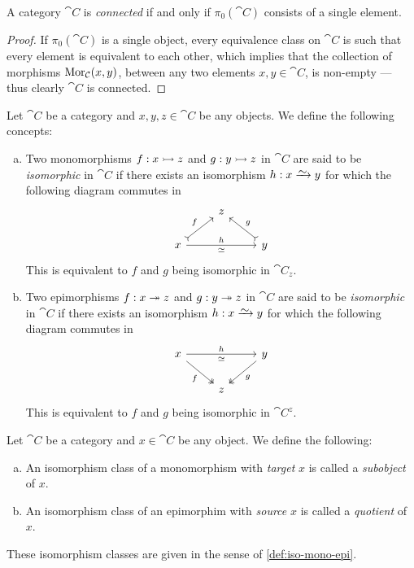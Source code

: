 \begin{corollary}
\label{cor:connected-iff-class-point}
A category \(\cat C\) is \emph{connected} if and only if \(\pi_0(\cat C)\)
consists of a single element.
\end{corollary}

\begin{proof}
If \(\pi_0(\cat C)\) is a single object, every equivalence class on \(\cat C\)
is such that every element is equivalent to each other, which implies that the
collection of morphisms \(\operatorname{Mor}_{\mathcal C}(x, y)\), between any two elements \(x, y
\in \cat C\), is non-empty --- thus clearly \(\cat C\) is connected.
\end{proof}

\begin{definition}
\label{def:iso-mono-epi}
Let \(\cat C\) be a category and \(x, y, z \in \cat C\) be any objects. We
define the following concepts:
\begin{enumerate}[(a)]\setlength\itemsep{0em}
\item Two monomorphisms \(f: x \rightarrowtail z\) and \(g: y \rightarrowtail z\) in \(\cat C\) are
  said to be \emph{isomorphic} in \(\cat C\) if there exists an isomorphism \(h:
  x \isoto y\) for which the following diagram commutes in
  \[
    \begin{tikzcd}
      &z & \\
      x \ar[rr, "h", "\iso"'] \ar[ur, tail, "f"] &
      &y \ar[ul, tail, swap, "g"]
    \end{tikzcd}
  \]
  This is equivalent to \(f\) and \(g\) being isomorphic in \(\cat C_z\).
\item Two epimorphisms \(f: x \twoheadrightarrow z\) and \(g: y \twoheadrightarrow z\) in \(\cat C\) are
  said to be \emph{isomorphic} in \(\cat C\) if there exists an isomorphism \(h:
  x \isoto y\) for which the following diagram commutes in
  \[
    \begin{tikzcd}
      x \ar[rr, "h", "\iso"'] \ar[dr, two heads, swap, "f"] &
      &y \ar[dl, two heads, "g"] \\
      &z &
    \end{tikzcd}
  \]
  This is equivalent to \(f\) and \(g\) being isomorphic in \(\cat C^z\).
\end{enumerate}
\end{definition}

\begin{definition}
\label{def:subobject-quotient}
Let \(\cat C\) be a category and \(x \in \cat C\) be any object. We define the
following:
\begin{enumerate}[(a)]\setlength\itemsep{0em}
\item An isomorphism class of a monomorphism with \emph{target} \(x\) is called a
  \emph{subobject} of \(x\).
\item An isomorphism class of an epimorphim with \emph{source} \(x\) is called a
  \emph{quotient} of \(x\).
\end{enumerate}
These isomorphism classes are given in the sense of \cref{def:iso-mono-epi}.
\end{definition}

